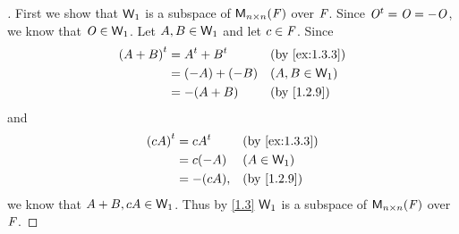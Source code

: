 \begin{proof}[]
  First we show that \(\mathsf{W}_1\) is a subspace of \(\mathsf{M}_{{n} \times n}({\mathit{F}})\) over \(\mathit{F}\).
  Since \({\mathit{O}}^{t} = \mathit{O} = -\mathit{O}\), we know that \(\mathit{O} \in \mathsf{W}_1\).
  Let \(A, B \in \mathsf{W}_1\) and let \(c \in \mathit{F}\).
  Since
  \begin{align*}
    \tp{(A + B)} & = \tp{A} + \tp{B} &  & \text{(by \cref{ex:1.3.3})} \\
                 & = (-A) + (-B)     &  & (A, B \in \W_1)             \\
                 & = -(A + B)        &  & \text{(by \cref{1.2.9})}
  \end{align*}
  and
  \begin{align*}
    \tp{(cA)} & = c \tp{A} &  & \text{(by \cref{ex:1.3.3})} \\
              & = c (-A)   &  & (A \in \W_1)                \\
              & = -(cA),   &  & \text{(by \cref{1.2.9})}
  \end{align*}
  we know that \(A + B, cA \in \mathsf{W}_1\).
  Thus by \cref{1.3} \(\mathsf{W}_1\) is a subspace of \(\mathsf{M}_{{n} \times n}({\mathit{F}})\) over \(\mathit{F}\).


\end{proof}
